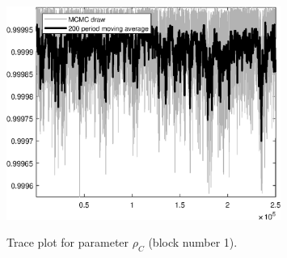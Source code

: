 \begin{figure}[H]
\centering
  \includegraphics[width=0.8\textwidth]{BRS_imp_mobility/graphs/TracePlot_rho_C_blck_1}\\
    \caption{Trace plot for parameter ${\rho_C}$ (block number 1).}
\end{figure}
